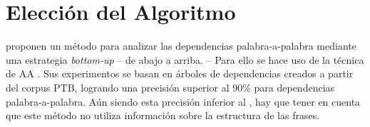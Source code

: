 \chapter{Elección del Algoritmo}
\label{ch:algorithm}
\citeauthor{yamada2003} \cite{yamada2003} proponen un método para analizar las
dependencias palabra-a-palabra mediante una estrategia \emph{bottom-up} -- de
abajo a arriba. -- Para ello se hace uso de la técnica de \ac{AA}
. Sus experimentos se basan en árboles de dependencias creados a
partir del corpus \ac{PTB}, logrando una precisión superior al 90\% para
dependencias palabra-a-palabra. Aún siendo esta precisión inferior al
, hay que tener en cuenta que este método no utiliza
información sobre la estructura de las frases.


